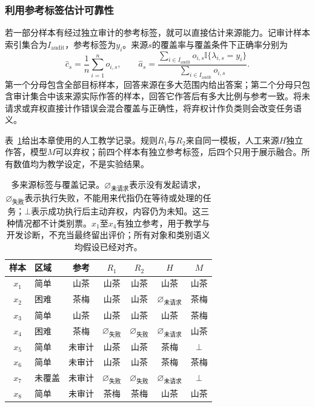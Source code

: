 \subsubsection{利用参考标签估计可靠性}
\label{sec:knowledge-fusion-reference-reliability}

若一部分样本有经过独立审计的参考标签，就可以直接估计来源能力。记审计样本索引集合为$I_{\mathrm{audit}}$，参考标签为$y_i$。来源$s$的覆盖率与覆盖条件下正确率分别为
\begin{equation}
  \widehat c_s
  =\frac{1}{n}\sum_{i=1}^{n}o_{i,s},
  \qquad
  \widehat a_s
  =\frac{\sum_{i\in I_{\mathrm{audit}}}
    o_{i,s}\mathbb{I}\{\lambda_{i,s}=y_i\}}
  {\sum_{i\in I_{\mathrm{audit}}}o_{i,s}}.
  \label{eq:knowledge-fusion-audited-reliability}
\end{equation}
第一个分母包含全部目标样本，回答来源在多大范围内给出答案；第二个分母只包含审计集合中该来源实际作答的样本，回答它作答后有多大比例与参考一致。将未请求或弃权直接计作错误会混合覆盖与正确性，将弃权计作负类则会改变任务语义。

表~\ref{tab:knowledge-fusion-source-records}给出本章使用的人工教学记录。规则$R_1$与$R_2$来自同一模板，人工来源$H$独立作答，模型$M$可以弃权；前四个样本有独立参考标签，后四个只用于展示融合。所有数值均为教学设定，不是实验结果。

\begin{table}[htbp]
  \centering
  \small
  \renewcommand{\arraystretch}{1.15}
  \begin{tabular}{@{}clccccc@{}}
    \toprule
    \textbf{样本} & \textbf{区域} & \textbf{参考} & \textbf{$R_1$} & \textbf{$R_2$} & \textbf{$H$} & \textbf{$M$} \\
    \midrule
    $x_1$ & 简单 & 山茶 & 山茶 & 山茶 & 山茶 & 山茶 \\
    $x_2$ & 困难 & 茶梅 & 山茶 & 山茶 & $\varnothing_{\text{未请求}}$ & 茶梅 \\
    $x_3$ & 简单 & 山茶 & 山茶 & 山茶 & 山茶 & 茶梅 \\
    $x_4$ & 困难 & 茶梅 & $\varnothing_{\text{失败}}$ & $\varnothing_{\text{失败}}$ & $\varnothing_{\text{未请求}}$ & 山茶 \\
    \midrule
    $x_5$ & 简单 & 未审计 & 山茶 & 山茶 & 茶梅 & $\bot$ \\
    $x_6$ & 简单 & 未审计 & 山茶 & 山茶 & 茶梅 & 茶梅 \\
    $x_7$ & 未覆盖 & 未审计 & $\varnothing_{\text{失败}}$ & $\varnothing_{\text{失败}}$ & $\varnothing_{\text{未请求}}$ & $\bot$ \\
    $x_8$ & 简单 & 未审计 & 茶梅 & 茶梅 & 山茶 & 山茶 \\
    \bottomrule
  \end{tabular}
  \caption{多来源标签与覆盖记录。$\varnothing_{\text{未请求}}$表示没有发起请求，$\varnothing_{\text{失败}}$表示执行失败，不能用来代指仍在等待或处理的任务；$\bot$表示成功执行后主动弃权，内容仍为未知。这三种情况都不计类别票。$x_1$至$x_4$有独立参考，用于教学与开发诊断，不充当最终留出评价；所有对象和类别语义均假设已经对齐。}
  \label{tab:knowledge-fusion-source-records}
\end{table}
\FloatBarrier

